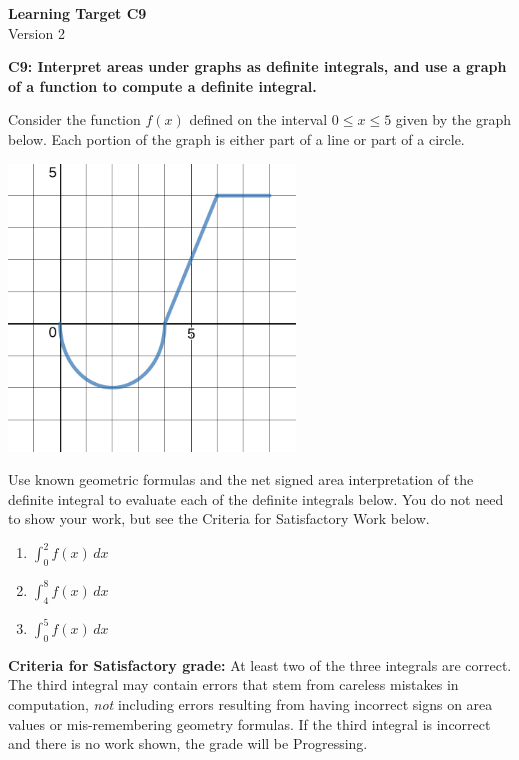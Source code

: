 \documentclass[10pt]{article}
\begin{document}
	\vspace*{0in}

		\begin{center}
			\textbf{Learning Target C9} \\
			{Version 2} \\
		\end{center}

\begin{framed}
	\textbf{C9: Interpret areas under graphs as definite integrals, and use a graph of a function to compute a definite integral.
}
\end{framed}

Consider the function $f(x)$ defined on the interval $0 \leq x \leq 5$ given by the graph below. Each portion of the graph is either part of a line or part of a circle. 

\begin{center}
    \includegraphics[width=3in]{c9-dec3.png}
\end{center}

Use known geometric formulas and the net signed area interpretation of the definite integral to evaluate each of the definite integrals below. You do not need to show your work, but see the Criteria for Satisfactory Work below. 

\begin{enumerate}
    \item $\displaystyle{\int_0^2 f(x) \, dx}$
    \item $\displaystyle{\int_4^8 f(x) \, dx}$
    \item $\displaystyle{\int_0^5 f(x) \, dx}$
\end{enumerate}


\vfill


\begin{small}
    \begin{framed}
        	\textbf{Criteria for Satisfactory grade:} At least two of the three integrals are correct. The third integral may contain errors that stem from careless mistakes in computation, \emph{not} including errors resulting from having incorrect signs on area values or mis-remembering geometry formulas. If the third integral is incorrect and there is no work shown, the grade will be Progressing. 
    \end{framed}
\end{small}
\end{document}

